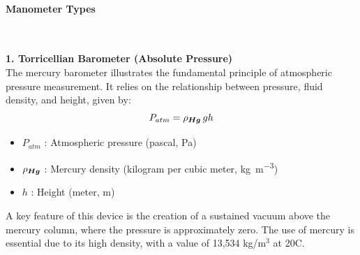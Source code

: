 \documentclass{article}
\begin{document}
\paragraph{Manometer Types}\mbox{}\\[1em]
\noindent
\begin{minipage}{0.65\textwidth}
	\small\textbf{1. Torricellian Barometer (Absolute Pressure)}\\[8pt]	
	\large The mercury barometer illustrates the fundamental principle of atmospheric pressure measurement. It relies on the relationship between pressure, fluid density, and height, given by:  
	\begin{equation}
		P_{atm} = \rho_{\tiny \bm{Hg}}\, g  h
	\end{equation}
	\begin{itemize}[itemsep=-1mm]
		\item $P_{atm}$ : Atmospheric pressure (pascal, \si{\Pa})
		\item $\rho_{\tiny \bm{Hg}}$ : Mercury density (kilogram per cubic meter, \si{\kg\per\m\cubed})
		\item $h$ : Height (meter, \si{\m})
	\end{itemize}
	A key feature of this device is the creation of a sustained vacuum above the mercury column, where the pressure is approximately zero. The use of mercury is essential due to its high density, with a value of 13,534 kg/m$^3$ at 20\textdegree C.
\end{minipage}\hfill
\end{document}

